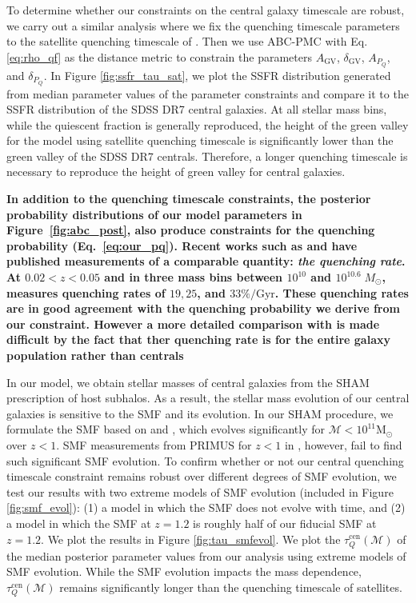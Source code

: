 \documentclass[iop,apj,tighten,twocolappendix,numberedappendix]{emulateapj}
\begin{document}
To determine whether our constraints on the central galaxy 
timescale are robust, we carry out a similar analysis where
we fix the quenching timescale parameters to the satellite quenching 
timescale of \cite{Wetzel:2013aa}. Then we use ABC-PMC with 
Eq. \ref{eq:rho_qf} as the distance metric to constrain the 
parameters $A_\mathrm{GV}$, $\delta_\mathrm{GV}$, $A_{P_Q}$, 
and $\delta_{P_Q}$. In Figure \ref{fig:ssfr_tau_sat}, we plot 
the SSFR distribution generated from median parameter values 
of the parameter constraints and compare it to the SSFR 
distribution of the SDSS DR7 central galaxies. At all stellar 
mass bins, while the quiescent fraction is generally reproduced, 
the height of the green valley for the model using satellite 
quenching timescale is significantly lower than the green valley 
of the SDSS DR7 centrals. 
Therefore, a longer quenching timescale is necessary to 
reproduce the height of green valley for central galaxies.

{\bf \color{dred}
In addition to the quenching timescale constraints, the posterior 
probability distributions of our model parameters in Figure~\ref{fig:abc_post}, 
also produce constraints for the quenching probability (Eq.~\ref{eq:our_pq}). 
Recent works such as \cite{Moustakas:2013aa} and \cite{Lian:2016aa} 
have published measurements of a comparable quantity: {\em the 
quenching rate}. At $0.02 < z < 0.05$ and in three mass bins between 
$10^{10}$ and $10^{10.6}\; M_\odot$, \cite{Lian:2016aa} measures 
quenching rates of $19, 25$, and $33\%/\mathrm{Gyr}$. These quenching
rates are in good agreement with the quenching probability we derive
from our constraint. 
However a more detailed comparison with \cite{Moustakas:2013aa} is 
made difficult by the fact that ther quenching rate is for the entire
galaxy population rather than centrals 
}

In our model, we obtain stellar masses of central galaxies 
from the SHAM prescription of host subhalos. As a result, 
the stellar mass evolution of our central galaxies is sensitive 
to the SMF and its evolution. In our SHAM procedure, we formulate 
the SMF based on \cite{Li:2009aa} and \cite{Marchesini:2009aa},
which evolves significantly for 
$\mathcal{M} < 10^{11} \mathrm{M}_\odot$ over $z < 1$. SMF measurements 
from PRIMUS for $z < 1$ in \cite{Moustakas:2013aa}, however, fail to find 
such significant SMF evolution. To confirm whether or not our 
central quenching timescale constraint remains robust over 
different degrees of SMF evolution, we test our results 
with two extreme models of SMF evolution (included in Figure 
\ref{fig:smf_evol}): (1) a model in which the SMF does not 
evolve with time, and (2) a model in which the SMF at $z = 1.2$ 
is roughly half of our fiducial SMF at $z=1.2$. We plot the 
results in Figure \ref{fig:tau_smfevol}.
We plot the $\tau^\mathrm{cen}_Q(\mathcal{M})$ of the median posterior 
parameter values from our analysis using extreme models of SMF evolution. 
While the SMF evolution impacts the mass dependence,  
$\tau^\mathrm{cen}_Q(\mathcal{M})$ remains significantly longer than the 
quenching timescale of satellites.
\end{document}
